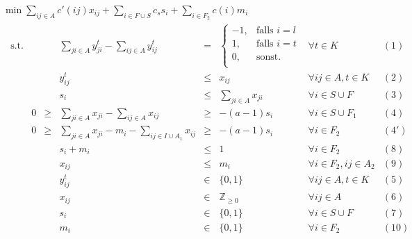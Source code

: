 \documentclass[11pt,a4paper]{article}
\newcommand{\Z}{\mathbb{Z}}
\theoremstyle{my_th_style1}
\begin{document}
  \bigskip
  $\min \displaystyle\sum_{ij \in A} c'(ij) x_{ij} + \displaystyle\sum_{i \in F \cup S} c_s s_i + \displaystyle\sum_{i \in F_2} c(i) m_i$
  \begin{align}\label{model_p2mpgk}
  \begin{array}{rcrcrcll}
  \textrm{s.t.}  
  && &\displaystyle\sum_{ji \in A} y_{ji}^t - \displaystyle\sum_{ij \in A} y_{ij}^t& = & \left\{\begin{array}{cl} 
  -1, & \text{falls } i=l\\ 
  1, & \text{falls } i=t\\ 
  0, & \text{sonst.}\\ 
  \end{array}
  \right. & \forall t \in K & (1) \\
  &&& y_{ij}^t & \leq & x_{ij} & \forall ij \in A, t\in K & (2)\\
    &&& s_i &\leq& \displaystyle\sum_{ji \in A} x_{ji}& \forall  i \in S \cup F & (3)\\ 
  &0&\geq&\displaystyle\sum_{ji \in A} x_{ji} - \displaystyle\sum_{ij \in A} x_{ij}&\geq& -(a-1)s_i & \forall i \in S \cup F_1& (4)\\
   &0&\geq&\displaystyle\sum_{ji \in A} x_{ji} -m_i - \displaystyle\sum_{ij \in I \cup A_1} x_{ij}&\geq& -(a-1)s_i & \forall i \in F_2& (4')\\
   &&&s_i+m_i & \leq & 1 & \forall i \in F_2 & (8)\\
   &&&x_{ij}& \leq & m_i & \forall i \in F_2, ij \in A_2 & (9) \\
    &&& y_{ij}^t & \in & \{0,1 \}& \forall ij \in A, t \in K & (5)\\
    &&& x_{ij} & \in & \Z_{\geq 0} & \forall ij \in A & (6)\\
    &&& s_i & \in & \{ 0,1 \} & \forall i \in S \cup F & (7) \\
    &&& m_i & \in & \{ 0,1 \} & \forall i \in F_2 & (10) \\
  \end{array}
  \end{align}
  
\end{document}
